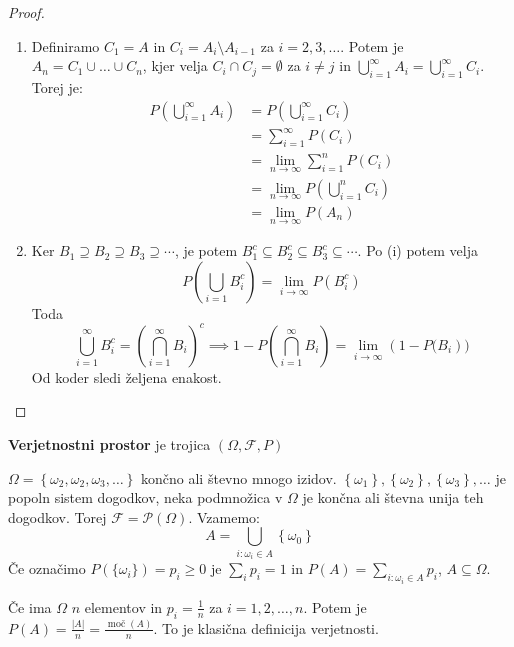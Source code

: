 \documentclass[12pt]{book}
\theoremstyle{definition}
\theoremstyle{plain}
\theoremstyle{plain}
\theoremstyle{plain}
\theoremstyle{remark}
\begin{document}
\begin{enumerate}[label=(\alph*)]
    \begin{proof}
        \begin{enumerate}[label=(\roman*)]
            \item Definiramo $C_1 = A$ in $C_i = A_i \setminus A_{i-1}$ za $i = 2, 3, \ldots$. Potem je $A_n=C_1 \cup \ldots \cup C_n$, kjer velja $C_i \cap C_j=\emptyset$ za $i \neq j$ in $\bigcup_{i=1}^{\infty} A_i=\bigcup_{i=1}^{\infty} C_i$. Torej je: 
            $$ \begin{aligned} P\left(\bigcup_{i=1}^{\infty} A_i \right) &= P\left(\bigcup_{i=1}^{\infty} C_i\right) \\ &= \sum_{i=1}^{\infty} P(C_i) \\ &= \lim _{n \to \infty} \sum_{i=1}^{n} P(C_i) \\ &= \lim _{n \to \infty} P\left(\bigcup_{i=1}^n C_i\right) \\ &= \lim_{n \to \infty} P(A_n) \end{aligned}$$ 
            \item Ker $B_1 \supseteq B_2 \supseteq B_3 \supseteq \cdots$, je potem $B_1^c \subseteq B_2^c \subseteq B_3^c \subseteq \cdots$. Po (i) potem velja 
            $$P\left(\bigcup_{i=1} B_i^c\right)=\lim _{i \to \infty} P\left(B_i^c\right)$$ 
            Toda $$ \bigcup_{i=1}^{\infty} B_i^c=\left(\bigcap_{i=1}^{\infty} B_i\right)^c \implies 1-P\left(\bigcap_{i=1}^{\infty} B_i\right)=\lim_{i \to \infty}\left(1-P(B_i\right)) $$ Od koder sledi željena enakost. 
        \end{enumerate}
    \end{proof}
\end{enumerate}

\textbf{Verjetnostni prostor} je trojica $(\Omega, \mathcal{F}, P)$

\begin{zgled}
    $\Omega=\left\{\omega_2, \omega_2, \omega_3, \ldots\right\}$ končno ali števno mnogo izidov. $\left\{\omega_1\right\},\left\{\omega_2\right\},\left\{\omega_3\right\}, \ldots$ je popoln sistem dogodkov, neka podmnožica v $\Omega$ je končna ali števna unija teh dogodkov. Torej $\mathcal{F}=\mathcal{P}(\Omega)$. Vzamemo:
    $$
    A=\bigcup_{i: \omega_i \in A}\left\{\omega_0\right\} 
    $$
    Če označimo $P(\{\omega_i\}) = p_i \geq 0$ je $\sum_i p_i=1$ in $P(A)=\sum_{i: \omega_i \in A} p_i$, $A \subseteq \Omega$.

    Če ima $\Omega$ $n$ elementov in $p_i = \frac{1}{n}$ za $i=1, 2, \ldots, n$. Potem je $P(A)=\frac{|A|}{n}=\frac{\operatorname{moč}(A)}{n}$. To je klasična definicija verjetnosti. 
\end{zgled}
\end{document}
